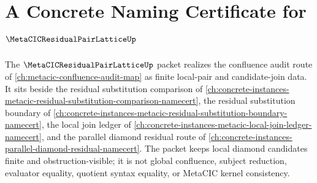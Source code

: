\chapter{A Concrete Naming Certificate for $\MetaCICResidualPairLatticeUp$}
\label{ch:concrete-instances-metacic-residual-pair-lattice-namecert}

The $\MetaCICResidualPairLatticeUp$ packet realizes the confluence audit route of \autoref{ch:metacic-confluence-audit-map} as finite local-pair and candidate-join data. It sits beside the residual substitution comparison of \autoref{ch:concrete-instances-metacic-residual-substitution-comparison-namecert}, the residual substitution boundary of \autoref{ch:concrete-instances-metacic-residual-substitution-boundary-namecert}, the local join ledger of \autoref{ch:concrete-instances-metacic-local-join-ledger-namecert}, and the parallel diamond residual route of \autoref{ch:concrete-instances-parallel-diamond-residual-namecert}. The packet keeps local diamond candidates finite and obstruction-visible; it is not global confluence, subject reduction, evaluator equality, quotient syntax equality, or MetaCIC kernel consistency.

